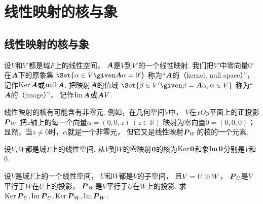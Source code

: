 \section{线性映射的核与象}
\subsection{线性映射的核与象}
\begin{definition}
设\(V\)和\(V'\)都是域\(F\)上的线性空间，
\(\boldsymbol{A}\)是\(V\)到\(V'\)的一个线性映射.
我们把\(V'\)中零向量\(0'\)在\(\boldsymbol{A}\)下的原象集
\(\Set{
	\alpha\in V
	\given
	\vb{A}\alpha=0'
}\)
称为“\(\boldsymbol{A}\)的（kernel, null space）”，
记作\(\operatorname{Ker}\boldsymbol{A}\)或\(\operatorname{null}\boldsymbol{A}\).
把映射\(\boldsymbol{A}\)的值域
\(\Set{
	\beta \in V'
	\given
	\beta = \vb{A}\alpha,
	\alpha \in V
}\)
称为“\(\boldsymbol{A}\)的（image）”，
记作\(\Im\boldsymbol{A}\)或\(\boldsymbol{A}V\).
\end{definition}
\begin{remark}
线性映射的核有可能含有非零元.
例如，在几何空间\(V\)中，
\(V\)在\(xOy\)平面上的正投影\(\boldsymbol{P}_W\)
把\(z\)轴上的每一个向量\(\alpha=(0,0,z)\ (z\in\mathbb{R})\)
映射为零向量\(0=(0,0,0)\)；
显然，当\(z\neq0\)时，\(\alpha\)就是一个非零元，
但它又是线性映射\(\boldsymbol{P}_W\)的核的一个元素.
\end{remark}

\begin{example}
设\(V,W\)都是域\(F\)上的线性空间.
从\(V\)到\(W\)的零映射\(\boldsymbol0\)的核为\(\operatorname{Ker}\boldsymbol0\)和象\(\Im\boldsymbol0\)分别是\(V\)和\(0\).
\end{example}

\begin{example}
设\(V\)是域\(F\)上的一个线性空间，
\(U\)和\(W\)都是\(V\)的子空间，
且\(V = U \oplus W\)，
\(\boldsymbol{P}_U\)是\(V\)平行于\(W\)在\(U\)上的投影，
\(\boldsymbol{P}_W\)是\(V\)平行于\(U\)在\(W\)上的投影.
求\(\operatorname{Ker}\boldsymbol{P}_U,
\Im\boldsymbol{P}_U,
\operatorname{Ker}\boldsymbol{P}_W,
\Im\boldsymbol{P}_W\).
\end{example}

